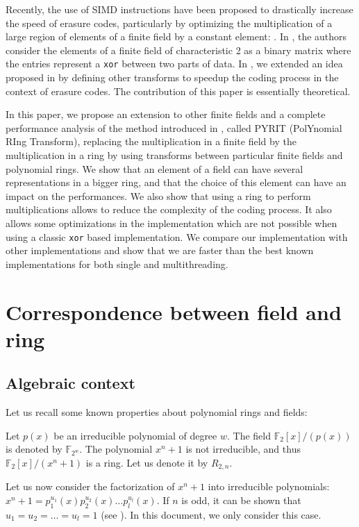 \documentclass[conference]{IEEEtran}
\begin{document}
Recently, the use of SIMD instructions have been proposed to drastically increase the speed of erasure codes, particularly by optimizing the multiplication of a large region of elements of a finite field by a constant element: \cite{Li:2008:PNC:1491269.1493312, 4770564, pgm:13:sfg}. In \cite{xor-luby}, the authors consider the elements of a finite field of characteristic 2 as a binary matrix where the entries represent a \texttt{xor} between two parts of data. In \cite{isit}, we extended an idea proposed in \cite{ITOH1989} by defining other transforms to speedup the coding process in the context of erasure codes. The contribution of this paper is essentially theoretical. 

In this paper, we propose an extension to other finite fields and a complete performance analysis of the method introduced in \cite{isit}, called PYRIT (PolYnomial RIng Transform), replacing the multiplication in a finite field by the multiplication in a ring by using transforms between particular finite fields and polynomial rings. We show that an element of a field can have several representations in a bigger ring, and that the choice of this element can have an impact on the performances.
We also show that using a ring to perform multiplications allows to reduce the complexity of the coding process. It also allows some optimizations in the implementation which are not possible when using a classic \texttt{xor} based implementation. 
We compare our implementation with other implementations and show that we are faster than the best known implementations for both single and multithreading.

\section{Correspondence between field and ring}
\label{sec:algebra}

\subsection{Algebraic context}

Let us recall some known properties about polynomial rings and fields:

Let $p(x)$ be an irreducible polynomial of degree $w$. The field  $\mathbb{F}_{2}[x]/(p(x))$ is denoted by $\mathbb{F}_{2^w}$. The polynomial $x^n+1$ is not irreducible, and thus $\mathbb{F}_{2}[x]/(x^n+1)$ is a ring. Let us denote it by $R_{2,n}$.

Let us now consider the factorization of $x^n+1$ into irreducible polynomials: $x^n+1=p_1^{u_1}(x)p_2^{u_2}(x)\ldots p_l^{u_l}(x)$.
If $n$ is odd, it can be shown that $u_1=u_2=\ldots=u_l=1$ (see \cite{poli1992error}). In this document, we only consider this case.
\end{document}
